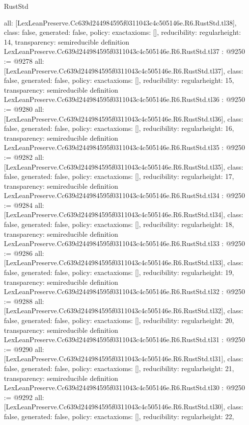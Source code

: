 \begin{lexlean}{RustStd}
\begin{coremodule}
{  all: [LexLeanPreserve.Cc639d244984595f0311043c4c505146e.R6.RustStd.tl38],
  class: false,
  generated: false,
  policy: exact{axioms: []},
  reducibility: regular{height: 14},
  transparency: semireducible
}
definition LexLeanPreserve.Cc639d244984595f0311043c4c505146e.R6.RustStd.tl37 : @9250 := @9278 {
  all: [LexLeanPreserve.Cc639d244984595f0311043c4c505146e.R6.RustStd.tl37],
  class: false,
  generated: false,
  policy: exact{axioms: []},
  reducibility: regular{height: 15},
  transparency: semireducible
}
definition LexLeanPreserve.Cc639d244984595f0311043c4c505146e.R6.RustStd.tl36 : @9250 := @9280 {
  all: [LexLeanPreserve.Cc639d244984595f0311043c4c505146e.R6.RustStd.tl36],
  class: false,
  generated: false,
  policy: exact{axioms: []},
  reducibility: regular{height: 16},
  transparency: semireducible
}
definition LexLeanPreserve.Cc639d244984595f0311043c4c505146e.R6.RustStd.tl35 : @9250 := @9282 {
  all: [LexLeanPreserve.Cc639d244984595f0311043c4c505146e.R6.RustStd.tl35],
  class: false,
  generated: false,
  policy: exact{axioms: []},
  reducibility: regular{height: 17},
  transparency: semireducible
}
definition LexLeanPreserve.Cc639d244984595f0311043c4c505146e.R6.RustStd.tl34 : @9250 := @9284 {
  all: [LexLeanPreserve.Cc639d244984595f0311043c4c505146e.R6.RustStd.tl34],
  class: false,
  generated: false,
  policy: exact{axioms: []},
  reducibility: regular{height: 18},
  transparency: semireducible
}
definition LexLeanPreserve.Cc639d244984595f0311043c4c505146e.R6.RustStd.tl33 : @9250 := @9286 {
  all: [LexLeanPreserve.Cc639d244984595f0311043c4c505146e.R6.RustStd.tl33],
  class: false,
  generated: false,
  policy: exact{axioms: []},
  reducibility: regular{height: 19},
  transparency: semireducible
}
definition LexLeanPreserve.Cc639d244984595f0311043c4c505146e.R6.RustStd.tl32 : @9250 := @9288 {
  all: [LexLeanPreserve.Cc639d244984595f0311043c4c505146e.R6.RustStd.tl32],
  class: false,
  generated: false,
  policy: exact{axioms: []},
  reducibility: regular{height: 20},
  transparency: semireducible
}
definition LexLeanPreserve.Cc639d244984595f0311043c4c505146e.R6.RustStd.tl31 : @9250 := @9290 {
  all: [LexLeanPreserve.Cc639d244984595f0311043c4c505146e.R6.RustStd.tl31],
  class: false,
  generated: false,
  policy: exact{axioms: []},
  reducibility: regular{height: 21},
  transparency: semireducible
}
definition LexLeanPreserve.Cc639d244984595f0311043c4c505146e.R6.RustStd.tl30 : @9250 := @9292 {
  all: [LexLeanPreserve.Cc639d244984595f0311043c4c505146e.R6.RustStd.tl30],
  class: false,
  generated: false,
  policy: exact{axioms: []},
  reducibility: regular{height: 22},
}
\end{coremodule}
\end{lexlean}
